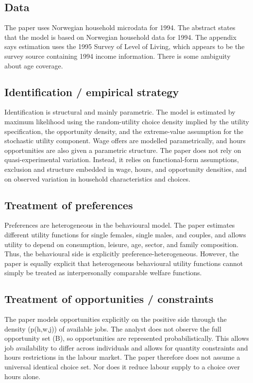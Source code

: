 \documentclass[11pt,a4paper]{article}
\begin{document}
\subsection*{Data}
The paper uses Norwegian household microdata for 1994. The abstract states that the model is based on Norwegian household data for 1994. The appendix says estimation uses the 1995 Survey of Level of Living, which appears to be the survey source containing 1994 income information. There is some ambiguity about age coverage.

\subsection*{Identification / empirical strategy}
Identification is structural and mainly parametric. The model is estimated by maximum likelihood using the random-utility choice density implied by the utility specification, the opportunity density, and the extreme-value assumption for the stochastic utility component. Wage offers are modelled parametrically, and hours opportunities are also given a parametric structure. The paper does not rely on quasi-experimental variation. Instead, it relies on functional-form assumptions, exclusion and structure embedded in wage, hours, and opportunity densities, and on observed variation in household characteristics and choices.

\subsection*{Treatment of preferences}
Preferences are heterogeneous in the behavioural model. The paper estimates different utility functions for single females, single males, and couples, and allows utility to depend on consumption, leisure, age, sector, and family composition. Thus, the behavioural side is explicitly preference-heterogeneous. However, the paper is equally explicit that heterogeneous behavioural utility functions cannot simply be treated as interpersonally comparable welfare functions.

\subsection*{Treatment of opportunities / constraints}
The paper models opportunities explicitly on the positive side through the density (p(h,w,j)) of available jobs. The analyst does not observe the full opportunity set (B), so opportunities are represented probabilistically. This allows job availability to differ across individuals and allows for quantity constraints and hours restrictions in the labour market. The paper therefore does not assume a universal identical choice set. Nor does it reduce labour supply to a choice over hours alone.
\end{document}
